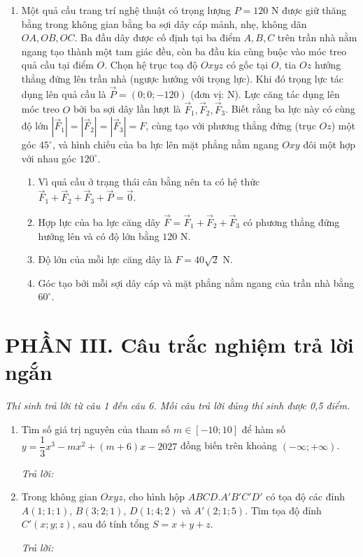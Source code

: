 \documentclass[12pt,a4paper]{article}
\newcommand{\otraloi}{\par\nobreak\smallskip\noindent\textit{Trả lời:}\quad\fbox{\rule{0pt}{11pt}\makebox[0.3cm]{}}\,\fbox{\rule{0pt}{11pt}\makebox[0.3cm]{}}\,\fbox{\rule{0pt}{11pt}\makebox[0.3cm]{}}\,\fbox{\rule{0pt}{11pt}\makebox[0.3cm]{}}}
\begin{document}
\begin{enumerate}[start=2]
\item Một quả cầu trang trí nghệ thuật có trọng lượng $P=120\text{ N}$ được giữ thăng bằng trong không gian bằng ba sợi dây cáp mảnh, nhẹ, không dãn $OA, OB, OC$. Ba đầu dây được cố định tại ba điểm $A, B, C$ trên trần nhà nằm ngang tạo thành một tam giác đều, còn ba đầu kia cùng buộc vào móc treo quả cầu tại điểm $O$. Chọn hệ trục toạ độ $Oxyz$ có gốc tại $O$, tia $Oz$ hướng thẳng đứng lên trần nhà (ngược hướng với trọng lực). Khi đó trọng lực tác dụng lên quả cầu là $\vec{P}=(0;0;-120)$ (đơn vị: N). Lực căng tác dụng lên móc treo $O$ bởi ba sợi dây lần lượt là $\vec{F}_1, \vec{F}_2, \vec{F}_3$. Biết rằng ba lực này có cùng độ lớn $|\vec{F}_1|=|\vec{F}_2|=|\vec{F}_3|=F$, cùng tạo với phương thẳng đứng (trục $Oz$) một góc $45^\circ$, và hình chiếu của ba lực lên mặt phẳng nằm ngang $Oxy$ đôi một hợp với nhau góc $120^\circ$.
\begin{enumerate}
\item Vì quả cầu ở trạng thái cân bằng nên ta có hệ thức $\vec{F}_1+\vec{F}_2+\vec{F}_3+\vec{P}=\vec{0}$.
\item Hợp lực của ba lực căng dây $\vec{F}=\vec{F}_1+\vec{F}_2+\vec{F}_3$ có phương thẳng đứng hướng lên và có độ lớn bằng $120\text{ N}$.
\item Độ lớn của mỗi lực căng dây là $F=40\sqrt{2}\text{ N}$.
\item Góc tạo bởi mỗi sợi dây cáp và mặt phẳng nằm ngang của trần nhà bằng $60^\circ$.
\end{enumerate}
\end{enumerate}

\vspace{3pt}
\section*{\large PHẦN III. Câu trắc nghiệm trả lời ngắn}
\textit{Thí sinh trả lời từ câu 1 đến câu 6. Mỗi câu trả lời đúng thí sinh được 0,5 điểm.}
\begin{enumerate}
\item Tìm số giá trị nguyên của tham số $m\in[-10;10]$ để hàm số $y=\dfrac{1}{3}x^3-mx^2+(m+6)x-2027$ đồng biến trên khoảng $(-\infty;+\infty)$.
\otraloi

\item Trong không gian $Oxyz$, cho hình hộp $ABCD.A'B'C'D'$ có tọa độ các đỉnh $A(1;1;1)$, $B(3;2;1)$, $D(1;4;2)$ và $A'(2;1;5)$. Tìm tọa độ đỉnh $C'(x;y;z)$, sau đó tính tổng $S=x+y+z$.
\otraloi
\end{enumerate}
\end{document}
